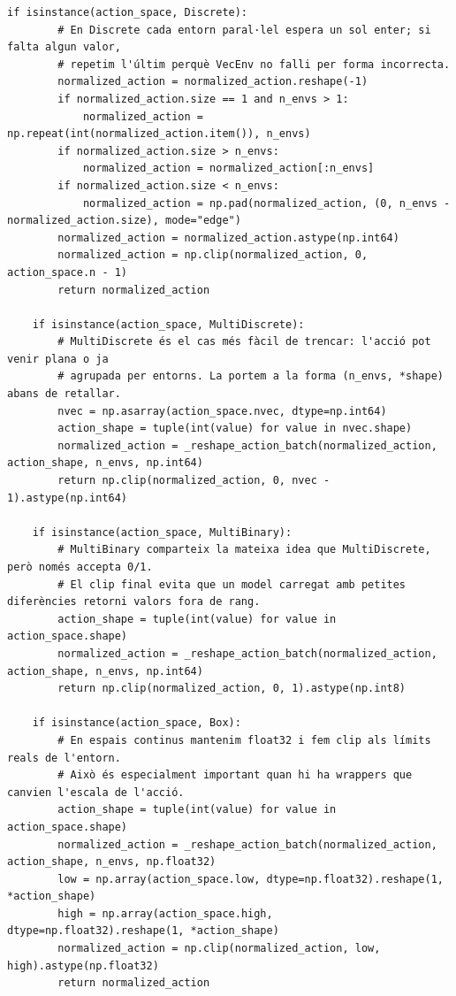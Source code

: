 \documentclass[10pt,a4paper]{article}
\begin{document}
\begin{lstlisting}[style=studioPython,caption={backend/sb3\_utils.py},label={lst:backend-sb3-utils-py}]
    if isinstance(action_space, Discrete):
        # En Discrete cada entorn paral·lel espera un sol enter; si falta algun valor,
        # repetim l'últim perquè VecEnv no falli per forma incorrecta.
        normalized_action = normalized_action.reshape(-1)
        if normalized_action.size == 1 and n_envs > 1:
            normalized_action = np.repeat(int(normalized_action.item()), n_envs)
        if normalized_action.size > n_envs:
            normalized_action = normalized_action[:n_envs]
        if normalized_action.size < n_envs:
            normalized_action = np.pad(normalized_action, (0, n_envs - normalized_action.size), mode="edge")
        normalized_action = normalized_action.astype(np.int64)
        normalized_action = np.clip(normalized_action, 0, action_space.n - 1)
        return normalized_action

    if isinstance(action_space, MultiDiscrete):
        # MultiDiscrete és el cas més fàcil de trencar: l'acció pot venir plana o ja
        # agrupada per entorns. La portem a la forma (n_envs, *shape) abans de retallar.
        nvec = np.asarray(action_space.nvec, dtype=np.int64)
        action_shape = tuple(int(value) for value in nvec.shape)
        normalized_action = _reshape_action_batch(normalized_action, action_shape, n_envs, np.int64)
        return np.clip(normalized_action, 0, nvec - 1).astype(np.int64)

    if isinstance(action_space, MultiBinary):
        # MultiBinary comparteix la mateixa idea que MultiDiscrete, però només accepta 0/1.
        # El clip final evita que un model carregat amb petites diferències retorni valors fora de rang.
        action_shape = tuple(int(value) for value in action_space.shape)
        normalized_action = _reshape_action_batch(normalized_action, action_shape, n_envs, np.int64)
        return np.clip(normalized_action, 0, 1).astype(np.int8)

    if isinstance(action_space, Box):
        # En espais continus mantenim float32 i fem clip als límits reals de l'entorn.
        # Això és especialment important quan hi ha wrappers que canvien l'escala de l'acció.
        action_shape = tuple(int(value) for value in action_space.shape)
        normalized_action = _reshape_action_batch(normalized_action, action_shape, n_envs, np.float32)
        low = np.array(action_space.low, dtype=np.float32).reshape(1, *action_shape)
        high = np.array(action_space.high, dtype=np.float32).reshape(1, *action_shape)
        normalized_action = np.clip(normalized_action, low, high).astype(np.float32)
        return normalized_action


\end{lstlisting}
\end{document}

